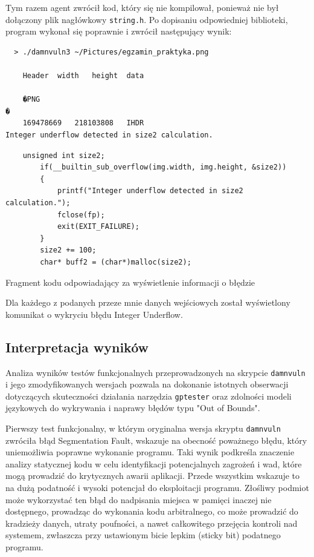 Tym razem agent zwrócił kod, który się nie kompilował, ponieważ nie był dołączony plik nagłówkowy \texttt{string.h}. Po dopisaniu odpowiedniej biblioteki, program wykonał się poprawnie i zwrócił następujący wynik:

\begin{verbatim}
  > ./damnvuln3 ~/Pictures/egzamin_praktyka.png 

	Header	width	height	data	

	�PNG
�
	169478669	218103808	IHDR
Integer underflow detected in size2 calculation.
\end{verbatim}

\begin{listing}
  \begin{verbatim}
    unsigned int size2;
        if(__builtin_sub_overflow(img.width, img.height, &size2))
        {
            printf("Integer underflow detected in size2 calculation.");
            fclose(fp);
            exit(EXIT_FAILURE);
        }
        size2 += 100;
        char* buff2 = (char*)malloc(size2);
\end{verbatim}
\caption{Fragment kodu odpowiadający za wyświetlenie informacji o błędzie}
\label{lst:code4}
\end{listing}

Dla każdego z podanych przeze mnie danych wejściowych został wyświetlony komunikat o wykryciu błędu Integer Underflow.

\subsection{Interpretacja wyników}
\label{subsec:interpretacja_wynikow}

Analiza wyników testów funkcjonalnych przeprowadzonych na skrypcie \texttt{damnvuln} i jego zmodyfikowanych wersjach pozwala na dokonanie istotnych obserwacji dotyczących skuteczności działania narzędzia \texttt{gptester} oraz zdolności modeli językowych do wykrywania i naprawy błędów typu "Out of Bounds".

Pierwszy test funkcjonalny, w którym oryginalna wersja skryptu \texttt{damnvuln} zwróciła błąd Segmentation Fault, wskazuje na obecność poważnego błędu, który uniemożliwia poprawne wykonanie programu. Taki wynik podkreśla znaczenie analizy statycznej kodu w celu identyfikacji potencjalnych zagrożeń i wad, które mogą prowadzić do krytycznych awarii aplikacji. Przede wszystkim wskazuje to na dużą podatność i wysoki potencjał do eksploitacji programu. Złośliwy podmiot może wykorzystać ten błąd do nadpisania miejsca w pamięci inaczej nie dostępnego, prowadząc do wykonania kodu arbitralnego, co może prowadzić do kradzieży danych, utraty poufności, a nawet całkowitego przejęcia kontroli nad systemem, zwłaszcza przy ustawionym bicie lepkim (sticky bit) podatnego programu. 

